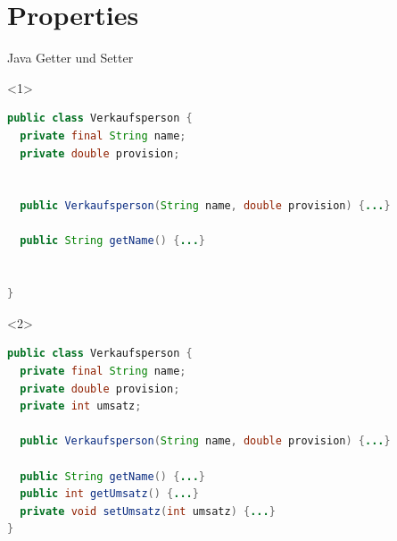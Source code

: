 \documentclass{beamer}
\begin{document}
\section{Properties}
\begin{frame}[fragile]{Java Getter und Setter}
  \begin{onlyenv}<1>
    \begin{lstlisting}[language=Java,xleftmargin=1em]
public class Verkaufsperson {
  private final String name;
  private double provision;

  
  public Verkaufsperson(String name, double provision) {...}
  
  public String getName() {...}


}
    \end{lstlisting}
  \end{onlyenv}
  \begin{onlyenv}<2>
    \begin{lstlisting}[language=Java,xleftmargin=1em]
public class Verkaufsperson {
  private final String name;
  private double provision;
  private int umsatz;
  
  public Verkaufsperson(String name, double provision) {...}
  
  public String getName() {...}
  public int getUmsatz() {...}
  private void setUmsatz(int umsatz) {...}
}
    \end{lstlisting}
  \end{onlyenv}
\end{frame}
\end{document}
